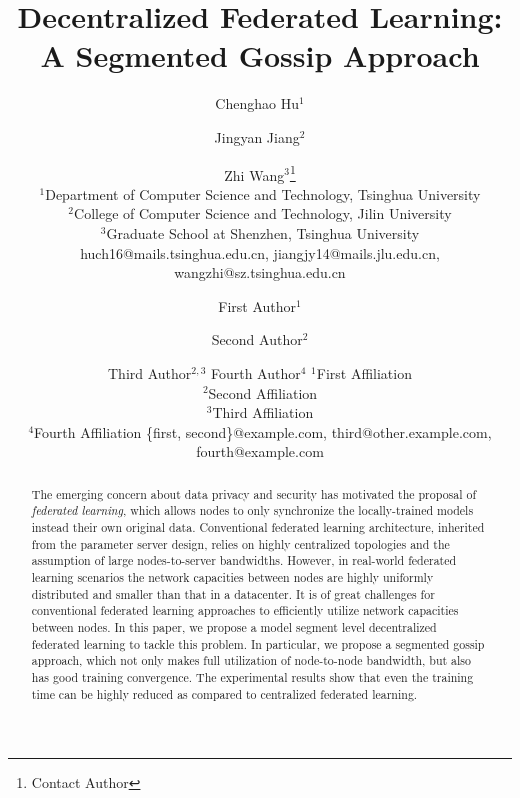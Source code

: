 \documentclass{article}
\title{Decentralized Federated Learning: A Segmented Gossip Approach}
\author{
Chenghao Hu$^1$\and
Jingyan Jiang$^2$\and
Zhi Wang$^{3}$\footnote{Contact Author}\\
\affiliations
$^1$Department of Computer Science and Technology, Tsinghua University\\
$^2$College of Computer Science and Technology, Jilin University  \\
$^3$Graduate School at Shenzhen, Tsinghua University \\
\emails
huch16@mails.tsinghua.edu.cn,
jiangjy14@mails.jlu.edu.cn,
wangzhi@sz.tsinghua.edu.cn
}
\author{
First Author$^1$
\and
Second Author$^2$\and
Third Author$^{2,3}$\And
Fourth Author$^4$
\affiliations
$^1$First Affiliation\\
$^2$Second Affiliation\\
$^3$Third Affiliation\\
$^4$Fourth Affiliation
\emails
\{first, second\}@example.com,
third@other.example.com,
fourth@example.com
}
\begin{document}
\maketitle

\begin{abstract}

The emerging concern about data privacy and security has motivated the proposal of \emph{federated learning}, which allows nodes to only synchronize the locally-trained models instead their own original data. Conventional federated learning architecture, inherited from the parameter server design, relies on highly centralized topologies and the assumption of large nodes-to-server bandwidths. However, in real-world federated learning scenarios the network capacities between nodes are highly uniformly distributed and smaller than that in a datacenter. It is of great challenges for conventional federated learning approaches to efficiently utilize network capacities between nodes. In this paper, we propose a model segment level decentralized federated learning to tackle this problem. In particular, we propose a segmented gossip approach, which not only makes full utilization of node-to-node bandwidth, but also has good training convergence. The experimental results show that even the training time can be highly reduced as compared to centralized federated learning.

\end{abstract}







%


\end{document}
